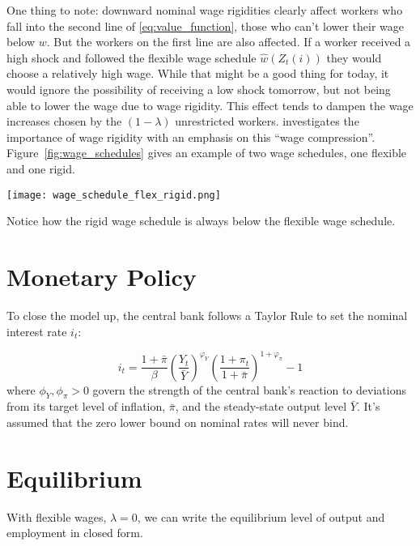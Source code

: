 \documentclass[12pt,a4paper]{scrartcl}            %
\begin{document}
One thing to note: downward nominal wage rigidities clearly affect workers who fall into the second line of \eqref{eq:value_function}, those who can't lower their wage below $w$.
But the workers on the first line are also affected.
If a worker received a high shock and followed the flexible wage schedule $\hat{w}(Z_t(i))$ they would choose a relatively high wage.
While that might be a good thing for today, it would ignore the possibility of receiving a low shock tomorrow, but not being able to lower the wage due to wage rigidity.
This effect tends to dampen the wage increases chosen by the $(1 - \lambda)$ unrestricted workers.
\cite{elsby_2009} investigates the importance of wage rigidity with an emphasis on this ``wage compression''.
Figure~\ref{fig:wage_schedules} gives an example of two wage schedules, one flexible and one rigid.

\begin{center}
  \texttt{[image: wage\_schedule\_flex\_rigid.png]}  %
  \label{fig:wage_schedules}
\end{center}
%
Notice how the rigid wage schedule is always below the flexible wage schedule.


\section{Monetary Policy}
\label{sec:monetary_policy}

To close the model up, the central bank follows a Taylor Rule to set the nominal interest rate $i_t$:

\begin{equation}
    \label{eq:taylor_rule}
    i_t = \frac{1 + \bar{\pi}}{\beta} \left( \frac{Y_t}{\bar{Y}} \right)^{\varphi_Y} \left( \frac{1 + \pi_t}{1 + \bar{\pi}} \right)^{1 + \varphi_{\pi}} - 1
\end{equation}
%
where $\phi_Y, \phi_{\pi} > 0$ govern the strength of the central bank's reaction to deviations from its target level of inflation, $\bar{\pi}$, and the steady-state output level $\bar{Y}$.
It's assumed that the zero lower bound on nominal rates will never bind.

\section{Equilibrium}
\label{sec:equilibrium}

With flexible wages, $\lambda = 0$, we can write the equilibrium level of output and employment in closed form.
\end{document}
